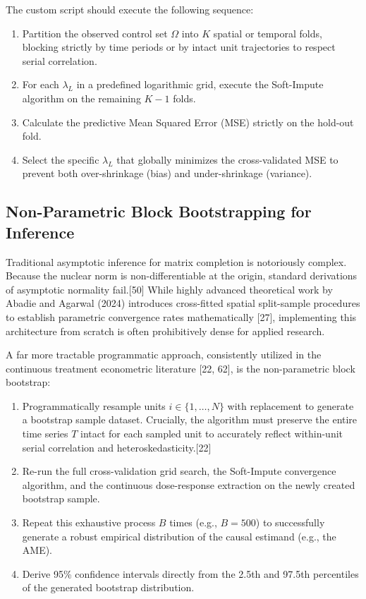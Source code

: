\documentclass{article}
\begin{document}
The custom script should execute the following sequence:
\begin{enumerate}
    \item Partition the observed control set $\Omega$ into $K$ spatial or temporal folds, blocking strictly by time periods or by intact unit trajectories to respect serial correlation.
    \item For each $\lambda_L$ in a predefined logarithmic grid, execute the Soft-Impute algorithm on the remaining $K-1$ folds.
    \item Calculate the predictive Mean Squared Error (MSE) strictly on the hold-out fold.
    \item Select the specific $\lambda_L$ that globally minimizes the cross-validated MSE to prevent both over-shrinkage (bias) and under-shrinkage (variance).
\end{enumerate}

\subsection{Non-Parametric Block Bootstrapping for Inference}

Traditional asymptotic inference for matrix completion is notoriously complex. Because the nuclear norm is non-differentiable at the origin, standard derivations of asymptotic normality fail.[50] While highly advanced theoretical work by Abadie and Agarwal (2024) introduces cross-fitted spatial split-sample procedures to establish parametric convergence rates mathematically [27], implementing this architecture from scratch is often prohibitively dense for applied research. 

A far more tractable programmatic approach, consistently utilized in the continuous treatment econometric literature [22, 62], is the non-parametric block bootstrap:
\begin{enumerate}
    \item Programmatically resample units $i \in \{1, \dots, N\}$ with replacement to generate a bootstrap sample dataset. Crucially, the algorithm must preserve the entire time series $T$ intact for each sampled unit to accurately reflect within-unit serial correlation and heteroskedasticity.[22]
    \item Re-run the full cross-validation grid search, the Soft-Impute convergence algorithm, and the continuous dose-response extraction on the newly created bootstrap sample.
    \item Repeat this exhaustive process $B$ times (e.g., $B=500$) to successfully generate a robust empirical distribution of the causal estimand (e.g., the AME).
    \item Derive 95\% confidence intervals directly from the 2.5th and 97.5th percentiles of the generated bootstrap distribution.
\end{enumerate}
\end{document}
